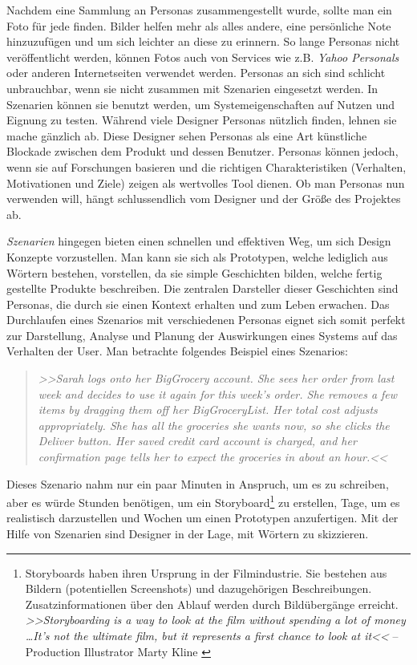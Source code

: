 \medskip Nachdem eine Sammlung an Personas zusammengestellt wurde, sollte man ein Foto für jede finden. Bilder helfen mehr als alles andere, eine persönliche Note hinzuzufügen und um sich leichter an diese zu erinnern. So lange Personas nicht veröffentlicht werden, können Fotos auch von Services wie z.B. \emph{Yahoo Personals} oder anderen Internetseiten verwendet werden. Personas an sich sind schlicht unbrauchbar, wenn sie nicht zusammen mit Szenarien eingesetzt werden. In Szenarien können sie benutzt werden, um Systemeigenschaften auf Nutzen und Eignung zu testen. 
Während viele Designer Personas nützlich finden, lehnen sie mache gänzlich ab. Diese Designer sehen Personas als eine Art künstliche Blockade zwischen dem Produkt und dessen Benutzer. Personas können jedoch, wenn sie auf Forschungen basieren und die richtigen Charakteristiken (Verhalten, Motivationen und Ziele) zeigen als wertvolles Tool dienen. Ob man Personas nun verwenden will, hängt schlussendlich vom Designer und der Größe des Projektes ab. \citep{Saffer:2007}

\medskip \emph{Szenarien} hingegen bieten einen schnellen und effektiven Weg, um sich Design Konzepte vorzustellen. Man kann sie sich als Prototypen, welche lediglich aus Wörtern bestehen, vorstellen, da sie simple Geschichten bilden, welche fertig gestellte Produkte beschreiben. Die zentralen Darsteller dieser Geschichten sind Personas, die durch sie einen Kontext erhalten und zum Leben erwachen. Das Durchlaufen eines Szenarios mit verschiedenen Personas eignet sich somit perfekt zur Darstellung, Analyse und Planung der Auswirkungen eines Systems auf das Verhalten der User. Man betrachte folgendes Beispiel eines Szenarios:

\begin{quote}
	\textsl{>>Sarah logs onto her BigGrocery account. She sees her order from last week and decides to use it again for this week's order. She removes a few items by dragging them off her BigGroceryList. Her total cost adjusts appropriately. She has all the groceries she wants now, so she clicks the Deliver button. Her saved credit card account is charged, and her confirmation page tells her to expect the groceries in about an hour.<<}
	 \begin{flushright} \citep{Saffer:2007} \end{flushright}
\end{quote}

Dieses Szenario nahm nur ein paar Minuten in Anspruch, um es zu schreiben, aber es würde Stunden benötigen, um ein Storyboard\footnote{Storyboards haben ihren Ursprung in der Filmindustrie. Sie bestehen aus Bildern (potentiellen Screenshots) und dazugehörigen Beschreibungen. Zusatzinformationen über den Ablauf werden durch Bildübergänge  erreicht. \emph{>>Storyboarding is a way to look at the film without spending a lot of money \ldots It’s not the ultimate film, but it represents a first chance to look at it<<} -- Production Illustrator Marty Kline \citep{Braa:1989}}  zu erstellen, Tage, um es realistisch darzustellen und Wochen um einen Prototypen anzufertigen. Mit der Hilfe von Szenarien sind Designer in der Lage, mit Wörtern zu skizzieren. \citep{Saffer:2007} 

